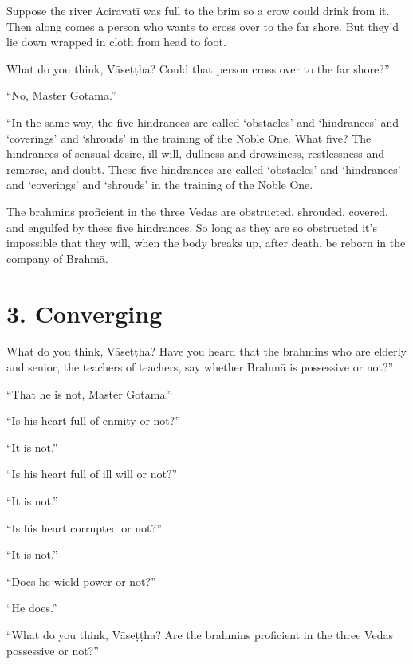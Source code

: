 \documentclass[12pt,openany]{book}%
\begin{document}
Suppose the river \textsanskrit{Aciravatī} was full to the brim so a crow could drink from it. Then along comes a person who wants to cross over to the far shore. But they’d lie down wrapped in cloth from head to foot. 

What do you think, \textsanskrit{Vāseṭṭha}? Could that person cross over to the far shore?” 

“No, Master Gotama.” 

“In the same way, the five hindrances are called ‘obstacles’ and ‘hindrances’ and ‘coverings’ and ‘shrouds’ in the training of the Noble One. What five? The hindrances of sensual desire, ill will, dullness and drowsiness, restlessness and remorse, and doubt. These five hindrances are called ‘obstacles’ and ‘hindrances’ and ‘coverings’ and ‘shrouds’ in the training of the Noble One. 

The brahmins proficient in the three Vedas are obstructed, shrouded, covered, and engulfed by these five hindrances. So long as they are so obstructed it’s impossible that they will, when the body breaks up, after death, be reborn in the company of \textsanskrit{Brahmā}. 

\section*{3. Converging }

What do you think, \textsanskrit{Vāseṭṭha}? Have you heard that the brahmins who are elderly and senior, the teachers of teachers, say whether \textsanskrit{Brahmā} is possessive or not?” 

“That he is not, Master Gotama.” 

“Is his heart full of enmity or not?” 

“It is not.” 

“Is his heart full of ill will or not?” 

“It is not.” 

“Is his heart corrupted or not?” 

“It is not.” 

“Does he wield power or not?” 

“He does.” 

“What do you think, \textsanskrit{Vāseṭṭha}? Are the brahmins proficient in the three Vedas possessive or not?” 
\end{document}
